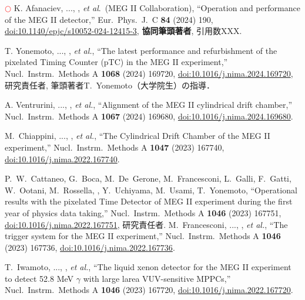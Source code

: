 \begin{enumerate}
\textcolor{red}{$\bigcirc$} 
K. Afanaciev, ..., \me, {\it et al}.\ (MEG II Collaboration),
  ``Operation and performance of the MEG II detector,''
  Eur.\ Phys.\ J.\ C {\bf 84}  (2024) 190,
  \href{https://doi.org/10.1140/epjc/s10052-024-12415-3}{doi:10.1140/epjc/s10052-024-12415-3},
  \textbf{協同筆頭著者}, 引用数XXX.

T. Yonemoto, ..., \me, {\it et al.},
``The latest performance and refurbishment of the pixelated Timing Counter (pTC) in the MEG II experiment,'' Nucl.\ Instrm.\ Methods A {\bf 1068} (2024) 169720,
\href{https://doi.org/10.1016/j.nima.2024.169720}{doi:10.1016/j.nima.2024.169720},
研究責任者, 筆頭著者T.~Yonemoto（大学院生）の指導．

A. Ventrurini, ..., \me, {\it et al.},
``Alignment of the MEG II cylindrical drift chamber,'' Nucl.\ Instrm.\ Methods A {\bf 1067} (2024) 169680,
\href{https://doi.org/10.1016/j.nima.2024.169680}{doi:10.1016/j.nima.2024.169680}.

M.~Chiappini, ..., \me, {\it et al.},
``The Cylindrical Drift Chamber of the MEG II experiment,'' Nucl.\ Instrm.\ Methods A {\bf 1047} (2023) 167740,
\href{https://doi.org/10.1016/j.nima.2022.167740}{doi:10.1016/j.nima.2022.167740}.

P.~W.~Cattaneo, G.~Boca, M.~De~Gerone, M.~Francesconi, L.~Galli, F.~Gatti, W.~Ootani, M.~Rossella, \me, Y.~Uchiyama, M.~Usami, T.~Yonemoto,
``Operational results with the pixelated Time Detector of MEG II experiment during the first year of physics data taking,'' Nucl.\ Instrm.\ Methods A {\bf 1046} (2023) 167751,
\href{https://doi.org/10.1016/j.nima.2022.167751}{doi:10.1016/j.nima.2022.167751},
研究責任者.
M.~Francesconi, ..., \me, {\it et al.},
``The trigger system for the MEG II experiment,'' Nucl.\ Instrm.\ Methods A {\bf 1046} (2023) 167736,
\href{https://doi.org/10.1016/j.nima.2022.167736}{doi:10.1016/j.nima.2022.167736}.

T.~Iwamoto, ..., \me, {\it et al.},
``The liquid xenon detector for the MEG II experiment to detect 52.8 MeV $\gamma$ with large larea VUV-sensitive MPPCs,'' Nucl.\ Instrm.\ Methods A {\bf 1046} (2023) 167720,
\href{https://doi.org/10.1016/j.nima.2022.167720}{doi:10.1016/j.nima.2022.167720}.




\end{enumerate}
